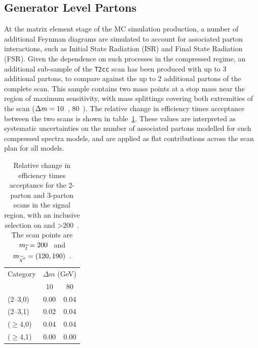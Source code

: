 
\subsection{Generator Level Partons}
At the \MADGRAPH matrix element stage of the MC simulation production, a number
of additional Feynman diagrams are simulated to account for associated parton 
interactions, such as Initial State Radiation (ISR) and Final State Radiation
(FSR). Given the dependence on such processes in the
compressed regime, an additional sub-sample of the \texttt{T2cc} scan 
has been produced with up to 3 additional partons, to compare against the up to
2 additional partons of the complete scan. This sample contains two mass points 
at a stop mass near the region of maximum sensitivity, with mass splittings 
covering both extremities of the scan ($\Delta m = 10$~\gev, 80~\gev). The relative
change in efficiency times 
acceptance between the two scans is shown in table~\ref{tab:sms-t2cc-2v3part}. 
These values are interpreted as systematic uncertainties on the number of 
associated partons modelled for such compressed spectra models, and are applied 
as flat contributions across the scan plan for all models.

\begin{table}[!h]
  \caption{Relative change in efficiency times acceptance for the
    2-parton and 3-parton scans in the signal region, with an inclusive 
    selection on \nb and \HT>200~\gev. The scan points are $m_{\widetilde{t}} = 200$~\gev 
    and $m_{\widetilde{\chi}^{0}} = (120, 190)$~\gev.}
  \label{tab:sms-t2cc-2v3part}
  \centering
  \small
  \begin{tabular}{ lcc }
    \hline
    \hline
    Category     & \multicolumn{2}{c}{$\Delta m$ (GeV)} \\
    \cline{2-3}
                 & 10   & 80                            \\
    \hline
    (2--3,0)     & 0.00 & 0.04                          \\
    (2--3,1)     & 0.02 & 0.04                          \\
    ($\geq 4$,0) & 0.04 & 0.04                          \\
    ($\geq 4$,1) & 0.00 & 0.00                          \\
    \hline
    \hline
  \end{tabular}
\end{table}

